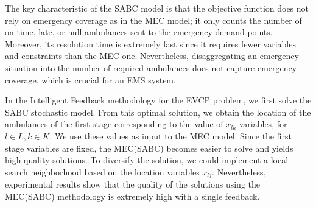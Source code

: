 The key characteristic of the SABC model is that the objective function does not rely on emergency coverage as in the MEC model; it only counts the number of on-time, late, or null ambulances sent to the emergency demand points. Moreover, its resolution time is extremely fast since it requires fewer variables and constraints than the MEC one. Nevertheless, disaggregating an emergency situation into the number of required ambulances does not capture emergency coverage, which is crucial for an EMS system.

In the Intelligent Feedback methodology for the EVCP problem, we first solve the SABC stochastic model.  From this optimal solution, we obtain the location of the ambulances of the first stage corresponding to the value of $x_{lk}$ variables, for $l\in L , k \in K$. We use these values as input to the MEC model.
Since the first stage variables are fixed, the MEC(SABC) becomes easier to solve and yields high-quality solutions. To diversify the solution, we could implement a local search neighborhood based on the location variables $x_{lj}$. Nevertheless, experimental results show that the quality of the solutions using the MEC(SABC) methodology is extremely high with a single feedback.    


